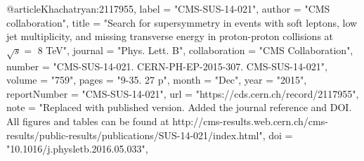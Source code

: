 @article{Khachatryan:2117955,
      label          = "CMS-SUS-14-021",
      author        = "{CMS collaboration}",
      title         = "{Search for supersymmetry in events with soft leptons, low
                       jet multiplicity, and missing transverse energy in
                       proton-proton collisions at $\sqrt{s}= $ 8 TeV}",
      journal       = "Phys. Lett. B",
      collaboration = "CMS Collaboration",
      number        = "CMS-SUS-14-021. CERN-PH-EP-2015-307. CMS-SUS-14-021",
      volume        = "759",
      pages         = "9-35. 27 p",
      month         = "Dec",
      year          = "2015",
      reportNumber  = "CMS-SUS-14-021",
      url           = "https://cds.cern.ch/record/2117955",
      note          = "Replaced with published version. Added the journal
                       reference and DOI. All figures and tables can be found at
                       http://cms-results.web.cern.ch/cms-results/public-results/publications/SUS-14-021/index.html",
      doi           = "10.1016/j.physletb.2016.05.033",
}

